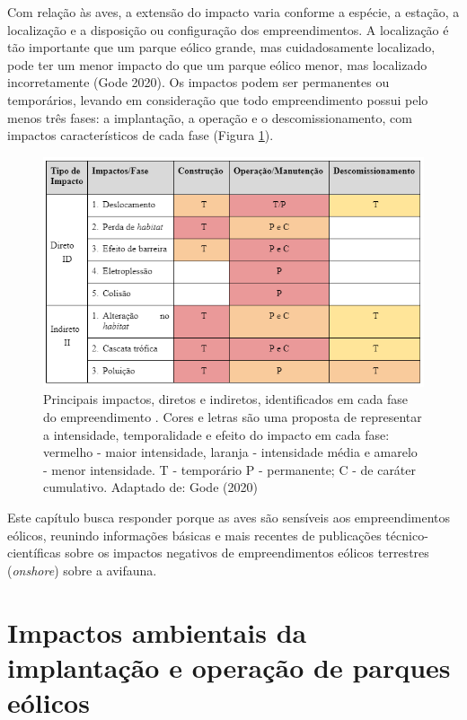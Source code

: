 \documentclass[
  oneside]{scrbook}
\begin{document}
Com relação às aves, a extensão do impacto varia conforme a espécie, a estação, a localização e a disposição ou configuração dos empreendimentos. A localização é tão importante que um parque eólico grande, mas cuidadosamente localizado, pode ter um menor impacto do que um parque eólico menor, mas localizado incorretamente (Gode 2020). Os impactos podem ser permanentes ou temporários, levando em consideração que todo empreendimento possui pelo menos três fases: a implantação, a operação e o descomissionamento, com impactos característicos de cada fase (Figura \ref{fig:12}).

\begin{figure}[H]

{\centering \includegraphics[width=0.75\linewidth]{imagens/cap04/Figura_4.1} 

}

\caption{Principais impactos, diretos e indiretos, identificados em cada fase do empreendimento . Cores e letras são uma proposta de representar a intensidade, temporalidade e efeito do impacto em cada fase: vermelho - maior intensidade, laranja - intensidade média e amarelo - menor intensidade. T - temporário P  -  permanente; C - de caráter cumulativo. Adaptado de: Gode (2020)}\label{fig:12}
\end{figure}

Este capítulo busca responder porque as aves são sensíveis aos empreendimentos eólicos, reunindo informações básicas e mais recentes de publicações técnico-científicas sobre os impactos negativos de empreendimentos eólicos terrestres (\emph{onshore}) sobre a avifauna.

\hypertarget{impactos-ambientais-da-implantauxe7uxe3o-e-operauxe7uxe3o-de-parques-euxf3licos}{%
\section{Impactos ambientais da implantação e operação de parques eólicos}\label{impactos-ambientais-da-implantauxe7uxe3o-e-operauxe7uxe3o-de-parques-euxf3licos}}
\end{document}
